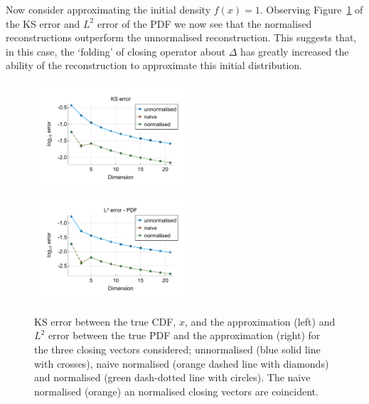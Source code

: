 \begin{example}Now consider approximating the initial density \(f(x)=1\). Observing Figure~\ref{fig: fun 4 ks error qbdrap closing vecs} of the KS error and \(L^2\) error of the PDF we now see that the normalised reconstructions outperform the unnormalised reconstruction. This suggests that, in this case, the `folding' of closing operator about \(\Delta\) has greatly increased the ability of the reconstruction to approximate this initial distribution. 
\begin{figure}[h]
	\centering
	\includegraphics[width=0.5\textwidth,trim={1.25cm 0.8cm 0.25cm 1.25cm},clip]{chapter6/figs/qbdrap_closing_vec/fun4/ks_error_formatted.pdf}%
	\includegraphics[width=0.5\textwidth,trim={1.25cm 0.8cm 0.25cm 1.25cm},clip]{chapter6/figs/qbdrap_closing_vec/fun4/l2_pdf_error_formatted.pdf}
	\caption{KS error between the true CDF, \(x\), and the approximation (left) and \(L^2\) error between the true PDF and the approximation (right) for the three closing vectors considered; unnormalised (blue solid line with crosses), naive normalised (orange dashed line with diamonds) and normalised (green dash-dotted line with circles). The naive normalised (orange) an normalised closing vectors are coincident.}
	\label{fig: fun 4 ks error qbdrap closing vecs}
\end{figure}


\end{example}

